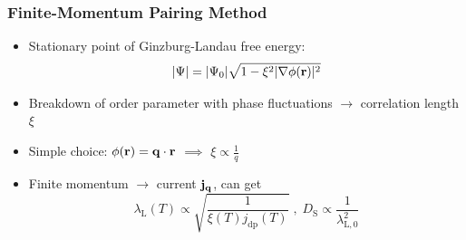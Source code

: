 \documentclass[aspectratio=169]{beamer}
\begin{document}
%	

\begin{frame}
	\frametitle{Finite-Momentum Pairing Method}
	
	\begin{itemize}
		\item Stationary point of Ginzburg-Landau free energy:
		\begin{equation}
			\vert \Psi \vert = \vert \Psi_0 \vert \sqrt{1 - \xi^2 \vert \nabla \phi (\mathbf{r}) \vert^2}
		\end{equation}
		\item Breakdown of order parameter with phase fluctuations \(\to\) correlation length \(\xi\)
		\item Simple choice: \(\phi (\mathbf{r}) = \mathbf{q} \cdot \mathbf{r}\) \(\implies\) \(\xi \propto \frac{1}{q}\)
		\item Finite momentum \(\to\) current \(\mathbf{j}_{\mathbf{q}}\), can get 
		\begin{equation}
			\lambda_{\mathrm{L}} (T) \propto \sqrt{\frac{1}{\xi(T) j_{\mathrm{dp}} (T)}} \;,\; D_{\mathrm{S}} \propto \frac{1}{\lambda_{\mathrm{L}, 0}^2}
		\end{equation}
	\end{itemize}
\end{frame}

	
\end{document}
